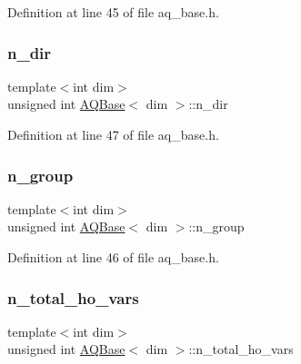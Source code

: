 Definition at line 45 of file aq\+\_\+base.\+h.

\mbox{\label{class_a_q_base_a93b0c70dd1d3ec401601ceaca88723b1}} 
\subsubsection{\texorpdfstring{n\+\_\+dir}{n\_dir}}
{\footnotesize\ttfamily template$<$int dim$>$ \\
unsigned int \hyperlink{class_a_q_base}{A\+Q\+Base}$<$ dim $>$\+::n\+\_\+dir\hspace{0.3cm}{\ttfamily [protected]}}



Definition at line 47 of file aq\+\_\+base.\+h.

\mbox{\label{class_a_q_base_a07b0839db1844f879f3d9c7d7014fb7f}} 
\subsubsection{\texorpdfstring{n\+\_\+group}{n\_group}}
{\footnotesize\ttfamily template$<$int dim$>$ \\
unsigned int \hyperlink{class_a_q_base}{A\+Q\+Base}$<$ dim $>$\+::n\+\_\+group\hspace{0.3cm}{\ttfamily [protected]}}



Definition at line 46 of file aq\+\_\+base.\+h.

\mbox{\label{class_a_q_base_a7169f8e3b53059317bb2144519f64be9}} 
\subsubsection{\texorpdfstring{n\+\_\+total\+\_\+ho\+\_\+vars}{n\_total\_ho\_vars}}
{\footnotesize\ttfamily template$<$int dim$>$ \\
unsigned int \hyperlink{class_a_q_base}{A\+Q\+Base}$<$ dim $>$\+::n\+\_\+total\+\_\+ho\+\_\+vars\hspace{0.3cm}{\ttfamily [protected]}}



